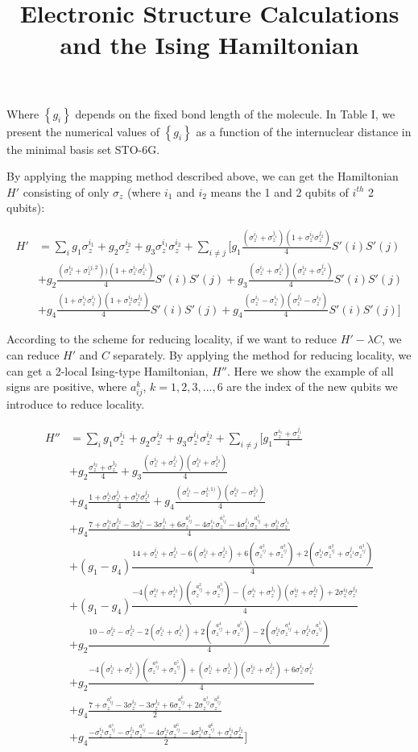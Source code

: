 \documentclass{article}
\newcommand\z[1]{\sigma_z^{#1}}\title{Electronic Structure Calculations and the Ising Hamiltonian}
\begin{document}
Where $\left\{g_i\right\}$ depends on the fixed bond length of the molecule. In Table I, we present the numerical values of $\left\{g_i\right\}$ as a function of the internuclear distance in the minimal basis set STO-6G.

By applying the mapping method described above, we can get the Hamiltonian $H'$ consisting of only $\sigma_z$ (where $i_1$ and $i_2$ means the 1 and 2 qubits of $i^{th}$ 2 qubits):

\begin{equation}
\begin{aligned}
H'&=\sum_{i}g_1\z{i_1}+g_2\z{i_2}+g_3\z{i_1}\z{i_2}+\sum_{i\neq j}[g_1\frac{(\z{i_1}+\z{j_1})(1+\z{i_2}\z{j_2})}{4}S'(i)S'(j)\\
&+g_2\frac{(\z{i_2}+\z{(j,2}))(1+\z{i_1}\z{j_1})}{4}S'(i)S'(j)+g_3\frac{(\z{i_1}+\z{j_1})(\z{i_2}+\z{j_2})}{4}S'(i)S'(j)\\
&+g_4\frac{(1+\z{i_1}\z{i_1})(1+\z{i_2}\z{j_2})}{4}S'(i)S'(j)+g_4\frac{(\z{i_1}-\z{i_1})(\z{j_2}-\z{i_2})}{4}S'(i)S'(j)]
\end{aligned}
\end{equation}

According to the scheme for reducing locality, if we want to reduce $H'-\lambda C$, we can reduce $H'$ and $C$ separately. By applying the method for reducing locality, we can get a 2-local Ising-type Hamiltonian, $H''$. Here we show the example of all signs are positive, where $a_{ij}^k$, $k=1,2,3,...,6$ are the index of the new qubits we introduce to reduce locality. 

\begin{equation}
\begin{aligned}
H''&=\sum_{i}g_1\z{i_1}+g_2\z{i_2}+g_3\z{i_1}\z{i_2}+\sum_{i \neq j}[g_1\frac{\z{i_1}+\z{j_1}}{4}\\
&+g_2\frac{\z{i_2}+\z{j_2}}{4}+g_3\frac{(\z{i_1}+\z{j_1})(\z{i_2}+\z{j_2})}{4}\\
&+g_4\frac{1+\z{i_1}\z{j_1}+\z{i_2}\z{j_2}}{4}+g_4\frac{(\z{i_1}-\z{j,1)})(\z{i_2}-\z{j_2})}{4}\\
&+g_4\frac{7+\z{i_2}\z{j_2}-3\z{i_1}-3\z{j_1}+6\z{a_{ij}^1}-4\z{i_1}\z{a_{ij}^1}-4\z{j_1}\z{a_{ij}^1}+\z{i_1}\z{j_1}}{4}\\
&+(g_1-g_4)\frac{14+\z{i_1}+\z{j_1}-6(\z{i_2}+\z{j_2})+6(\z{a_{ij}^2}+\z{a_{ij}^3})+2(\z{i_1}\z{a_{ij}^2}+\z{j_1}\z{a_{ij}^3})}{4}\\
&+(g_1-g_4)\frac{-4(\z{i_2}+\z{j_2})(\z{a_{ij}^2}+\z{a_{ij}^3})-(\z{i_1}+\z{j_1})(\z{i_2}+\z{j_2})+2\z{i_2}\z{j_2}}{4}\\
&+g_2\frac{10-\z{i_2}-\z{j_2}-2(\z{i_1}+\z{j_1})+2(\z{a_{ij}^4}+\z{a_{ij}^5})-2(\z{i_2}\z{a_{ij}^4}+\z{j_2}\z{a_{ij}^5})}{4}\\
&+g_2\frac{-4(\z{i_1}+\z{j_1})(\z{a_{ij}^4}+\z{a_{ij}^5})+(\z{i_1}+\z{j_1})(\z{i_2}+\z{j_2})+6\z{i_1}\z{j_1}}{4}\\
&+g_4\frac{7+\z{a_{ij}^1}-3\z{i_2}-3\z{j_2}+6\z{a_{ij}^6}+2\z{a_{ij}^1}\z{a_{ij}^6}}{2}\\
&+g_4\frac{-\z{i_2}\z{a_{ij}^1}-\z{j_2}\z{a_{ij}^1}-4\z{i_2}\z{a_{ij}^6}-4\z{j_2}\z{a_{ij}^6}+\z{i_2}\z{j_2}}{2}]
\end{aligned}
\end{equation}
\end{document}
